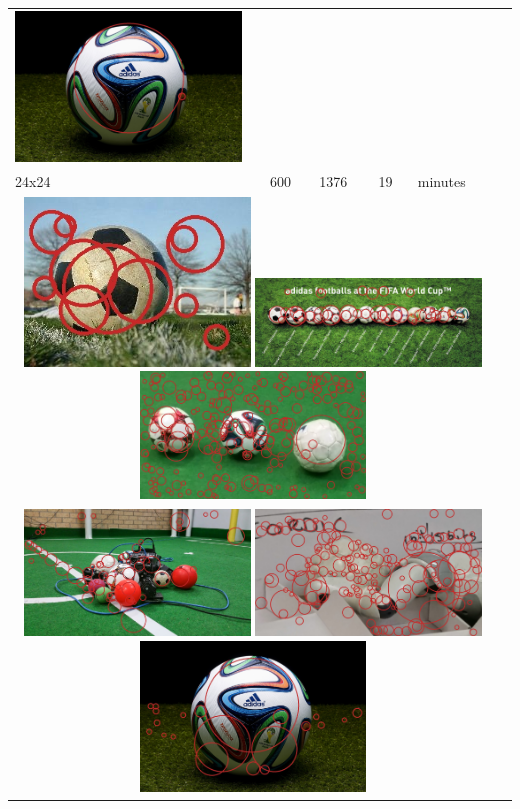 \begin{tabularx}{\textwidth}{llllll}
{        \includegraphics[width=6.0cm]{results/2/sphere_8}
    } \\
    24x24 & 600 & 1376 & 19 & \mytilda17 minutes \\
    \multicolumn{5}{c}{
        \includegraphics[width=6.0cm]{results/3/sphere_3}
        \includegraphics[width=6.0cm]{results/3/sphere_4}
        \includegraphics[width=6.0cm]{results/3/sphere_5}
    } \\
    \multicolumn{5}{c}{
        \includegraphics[width=6.0cm]{results/3/sphere_6}
        \includegraphics[width=6.0cm]{results/3/sphere_7}
        \includegraphics[width=6.0cm]{results/3/sphere_8}
    } \\
\end{tabularx}
